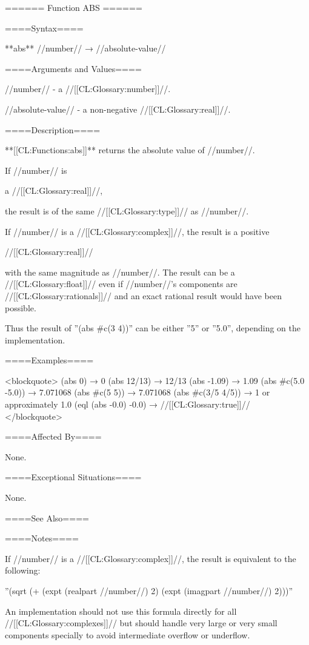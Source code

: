 ====== Function ABS ======

====Syntax====

**abs** //number// → //absolute-value//

====Arguments and Values====

//number// - a //[[CL:Glossary:number]]//.

//absolute-value// - a non-negative //[[CL:Glossary:real]]//.

====Description====

**[[CL:Functions:abs]]** returns the absolute value of //number//.

If //number// is

a //[[CL:Glossary:real]]//,

the result is of the same //[[CL:Glossary:type]]// as //number//.

If //number// is a //[[CL:Glossary:complex]]//, the result is a positive

//[[CL:Glossary:real]]//

with the same magnitude as //number//. The result can be a //[[CL:Glossary:float]]//  even if //number//'s components are //[[CL:Glossary:rationals]]// and an exact rational result would have been possible.

Thus the result of ''(abs #c(3 4))'' can be either ''5'' or ''5.0'', depending on the implementation.

====Examples====

<blockquote> (abs 0) → 0 (abs 12/13) → 12/13 (abs -1.09) → 1.09 (abs #c(5.0 -5.0)) → 7.071068 (abs #c(5 5)) → 7.071068 (abs #c(3/5 4/5)) → 1 or approximately 1.0 (eql (abs -0.0) -0.0) → //[[CL:Glossary:true]]// </blockquote>

====Affected By====

None.

====Exceptional Situations====

None.

====See Also====

{\secref\FloatSubstitutability}

====Notes====

If //number// is a //[[CL:Glossary:complex]]//, the result is equivalent to the following:

''(sqrt (+ (expt (realpart //number//) 2) (expt (imagpart //number//) 2)))''

An implementation should not use this formula directly for all //[[CL:Glossary:complexes]]// but should handle very large or very small components specially to avoid intermediate overflow or underflow.

  

